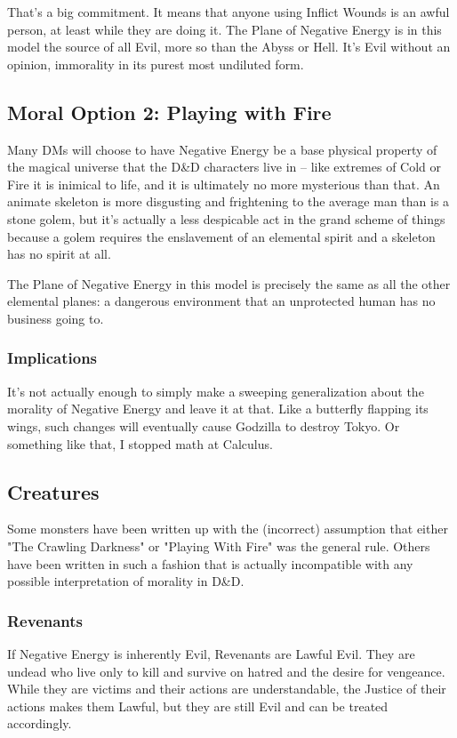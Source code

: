 That's a big commitment. It means that anyone using Inflict Wounds is an awful person, at least while they are doing it. The Plane of Negative Energy is in this model the source of all Evil, more so than the Abyss or Hell. It's Evil without an opinion, immorality in its purest most undiluted form.

\subsection{Moral Option 2: Playing with Fire}

Many DMs will choose to have Negative Energy be a base physical property of the magical universe that the D\&D characters live in -- like extremes of Cold or Fire it is inimical to life, and it is ultimately no more mysterious than that. An animate skeleton is more disgusting and frightening to the average man than is a stone golem, but it's actually a less despicable act in the grand scheme of things because a golem requires the enslavement of an elemental spirit and a skeleton has no spirit at all.

The Plane of Negative Energy in this model is precisely the same as all the other elemental planes: a dangerous environment that an unprotected human has no business going to.

\subsubsection{Implications}

It's not actually enough to simply make a sweeping generalization about the morality of Negative Energy and leave it at that. Like a butterfly flapping its wings, such changes will eventually cause Godzilla to destroy Tokyo. Or something like that, I stopped math at Calculus.

\subsection{Creatures}

Some monsters have been written up with the (incorrect) assumption that either "The Crawling Darkness" or "Playing With Fire" was the general rule. Others have been written in such a fashion that is actually incompatible with any possible interpretation of morality in D\&D.

\subsubsection{Revenants} If Negative Energy is inherently Evil, Revenants are Lawful Evil. They are undead who live only to kill and survive on hatred and the desire for vengeance. While they are victims and their actions are understandable, the Justice of their actions makes them Lawful, but they are still Evil and can be treated accordingly.

